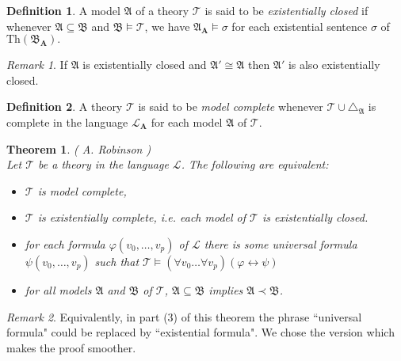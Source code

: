 \documentclass[titlepage, oneside]{amsbook}
\theoremstyle{plain}
\newtheorem{theorem}{Theorem}
\theoremstyle{definition}
\newtheorem{definition}{Definition}
\theoremstyle{remark}
\newtheorem*{rem}{Remark}
\newcommand{\Th}{\ensuremath{\mbox{Th}}}
\newcommand{\tria}[1]{\ensuremath{\triangle_{\mathfrak{#1}}}}
\newcommand{\theory}{\ensuremath{\mathcal{T}}}
\newcommand{\lan}{\ensuremath{\mathcal{L}}}
\newcommand{\seq}{\ensuremath{\subseteq}}
\newcommand{\ma}{\ensuremath{\mathfrak{A}}}
\newcommand{\mb}{\ensuremath{\mathfrak{B}}}
\newcommand{\ba}{\ensuremath{\mathbf{A}}}
\begin{document}
\begin{definition}
%
 A model $\mathfrak{A}$ of a theory
$\mathcal{T}$ is 
said to be \emph{existentially closed} if  whenever $\mathfrak{A}
\subseteq \mathfrak{B}$ and $\mb \models \mathcal{T}$, we have  
$\mathfrak{A}_{\mathbf{A}} \models \sigma$ for each existential
sentence $\sigma$ of $\Th (\mb_\ba).$
\end{definition}

\begin{rem} If $\ma$ is existentially closed and $\ma' \cong \ma$ then  
$\ma'$ is also  existentially  closed.
\end{rem} 

\begin{definition}
%
 A theory $\mathcal{T} $ is said to be
\emph{ model complete } 
whenever $\theory \cup \tria A$ is complete in the language $\lan_\ba$
for each model $\ma$ of $\theory$.
\end{definition}

\begin{theorem}\label{T:robinson} ( A. Robinson )\\
%
Let $\mathcal{T} $ be a theory in the language $\mathcal{L} $. The
following are equivalent:
\begin{itemize}
\item[(1)] $\mathcal{T} $ is model complete,
\item[(2)] $\mathcal{T} $ is existentially complete, i.e. each 
model of $\mathcal{T} $ is existentially closed.
\item[(3)] for each formula $\varphi ( v_{0} , \dots , v_{p}) $ of
$\mathcal{L} $ 
there is some universal formula \\ $\psi (v_{0} , \dots , v_{p}) $ such that 
$\mathcal{T} \models ( \forall v_{0} \dots \forall v_{p} ) ( \varphi 
\leftrightarrow \psi ) $ 
\item[(4)] for all models $\ma$ and $\mb$ of $\theory$, $\ma \seq \mb$
implies $\ma \prec \mb$.
\end{itemize}
\end{theorem}

\begin{rem} Equivalently, in part (3) of this theorem the phrase ``universal formula" could be replaced by ``existential formula". We chose the version which makes the proof smoother.
\end{rem} 
\end{document}
